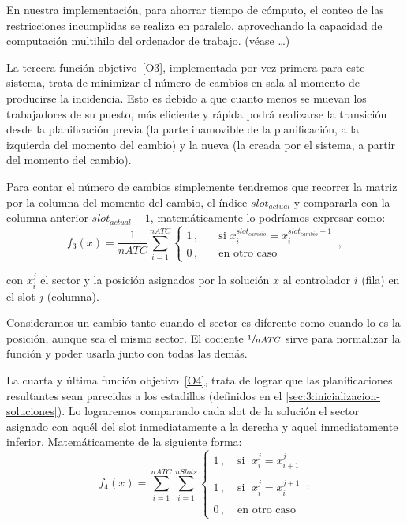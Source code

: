 En nuestra implementación, para ahorrar tiempo de cómputo, el conteo de las restricciones incumplidas se realiza en paralelo, aprovechando la capacidad de computación multihilo del ordenador de trabajo. (véase \ldots) %

La tercera función objetivo~\ref{O3}, implementada por vez primera para este sistema, trata de minimizar el número de cambios en sala al momento de producirse la incidencia. Esto es debido a que cuanto menos se muevan los trabajadores de su puesto, más eficiente y rápida podrá realizarse la transición desde la planificación previa (la parte inamovible de la planificación, a la izquierda del momento del cambio) y la nueva (la creada por el sistema, a partir del momento del cambio).

Para contar el número de cambios simplemente tendremos que recorrer la matriz por la columna del momento del cambio, el índice $slot_{actual}$ y compararla con la columna anterior $slot_{actual}-1$, matemáticamente lo podríamos expresar como:
%
\[
    f_3(x) = \frac{1}{nATC} \sum_{i=1}^{nATC}
    \begin{cases}
        1\,, & \quad \textrm{si } x_i^{slot_{cambio}} = x_i^{slot_{cambio}-1} \\
        0\,, & \quad \textrm{en otro caso }
    \end{cases}
    \,,
\]



con $x_i^j$ el sector y la posición asignados por la solución $x$ al controlador $i$ (fila) en el slot $j$ (columna).

Consideramos un cambio tanto cuando el sector es diferente como cuando lo es la posición, aunque sea el mismo sector.
El cociente $\sfrac{1}{nATC}$ sirve para normalizar la función y poder usarla junto con todas las demás.

La cuarta y última función objetivo~\ref{O4}, trata de lograr que las planificaciones resultantes sean parecidas a los estadillos (definidos en el \autoref{sec:3:inicializacion-soluciones}). Lo lograremos comparando cada slot de la solución el sector asignado con aquél del slot inmediatamente a la derecha y aquel inmediatamente inferior. Matemáticamente de la siguiente forma:
%
\[
    f_4(x) = \sum_{i=1}^{nATC} \sum_{i=1}^{nSlots}
    \begin{cases}
        1\,, & \; \textrm{si } \; x_i^j = x_{i+1}^{j} \\
        \\
        1\,, & \; \textrm{si } \; x_i^j = x_{i}^{j+1}   \\
        \\
        0\,, & \; \textrm{en otro caso }
    \end{cases}
    \,,
\]

